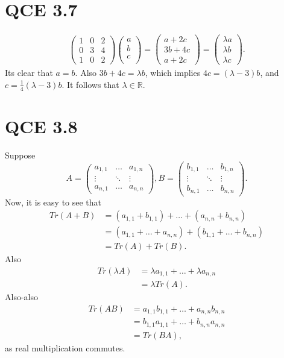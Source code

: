 \documentclass[10pt]{article}
\begin{document}
\section*{QCE 3.7}
\begin{align*}
\begin{pmatrix}
1 & 0 & 2 \\
0 & 3 & 4 \\
1 & 0 & 2
\end{pmatrix} \begin{pmatrix}
a \\
b \\
c \\
\end{pmatrix} = \begin{pmatrix}
a + 2c \\
3b + 4c \\
a + 2c
\end{pmatrix} = 
\begin{pmatrix}
\lambda a \\
\lambda b \\
\lambda c
\end{pmatrix}.
\end{align*}
Its clear that $a = b$. Also $3b + 4c = \lambda b$, which implies $4c = (\lambda - 3)b$, and $c = \frac{1}{4}(\lambda - 3)b$. It follows that $\lambda \in \mathbb{R}$.

\section*{QCE 3.8}
Suppose
\[
A = \begin{pmatrix}
a_{1, 1} & \dots & a_{1,n} \\
\vdots & \ddots & \vdots \\
a_{n, 1} & \dots & a_{n, n}
\end{pmatrix},
B = \begin{pmatrix}
b_{1, 1} & \dots & b_{1,n} \\
\vdots & \ddots & \vdots \\
b_{n, 1} & \dots & b_{n, n}
\end{pmatrix}.
\]
 Now, it is easy to see that 
\begin{align*}
Tr(A + B) &= (a_{1, 1} + b_{1, 1}) + \dots + (a_{n,n} + b_{n, n}) \\
               &= (a_{1,1} + \dots + a_{n,n})  + (b_{1,1} + \dots + b_{n,n}) \\
               &= Tr(A) + Tr(B).
\end{align*}
Also
\begin{align*}
  Tr(\lambda A) &= \lambda a_{1,1} + \dots + \lambda a_{n,n} \\
                        &= \lambda Tr(A).
\end{align*}
Also-also
\begin{align*}
Tr(AB) &= a_{1, 1}b_{1,1} + \dots + a_{n,n}b_{n,n} \\
          &= b_{1, 1}a_{1,1} + \dots + b_{n,n}a_{n,n} \\
          &= Tr(BA),
\end{align*}
as real multiplication commutes.
\end{document}
